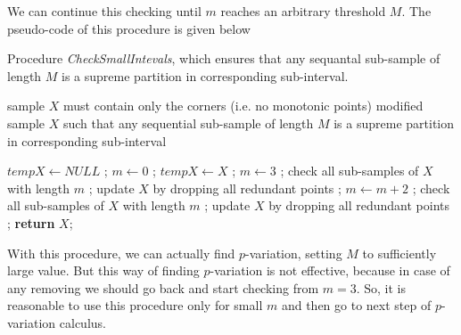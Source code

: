 \documentclass[12pt, a4paper]{article}
\numberwithin{equation}{section}
\begin{document}
We can continue this checking until $m$ 
reaches an arbitrary threshold $M$.
The  pseudo-code  of this procedure is given below

\begin{algorithm}[H]
\caption{Procedure \emph{CheckSmallIntevals}, which ensures 
that any sequantal sub-sample of length $M$ is a supreme partition in corresponding sub-interval.}
\label{alg:CheckSmallIntevals}
\begin{algorithmic}[1]
\Require sample $X$ must contain only the corners (i.e. no monotonic points)
\Output modified sample $X$ such that any sequential sub-sample of length $M$ is a supreme partition in corresponding sub-interval
\item[]
\State $tempX \leftarrow NULL$ ;
\State $m \leftarrow 0$ ;
  \State $tempX \leftarrow X$ ;
  \State $m \leftarrow 3$ ;
  \State check all sub-samples of $X$ with length $m$ ;
  \State update $X$ by dropping all redundant points ;  
    \State $m \leftarrow m + 2$ ;
    \State check all sub-samples of $X$ with length $m$ ;
    \State update $X$ by dropping all redundant points ; 
  \EndWhile
\EndWhile
\State \textbf{return} $X$;
\EndFunction
\end{algorithmic}
\end{algorithm}



%
%    



With this procedure, we can actually find 
$p$-variation, setting $M$ to sufficiently large value.
But this way of finding $p$-variation is not effective, 
because in case of any removing 
we should go back and start checking
from $m=3$.
So, it is reasonable to use this procedure
only for small $m$ and then go
to next step of $p$-variation calculus.
\end{document}
